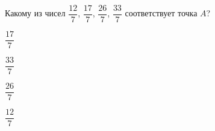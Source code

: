 \begin{ex}
	\begin{condition}
		Какому из чисел $\dfrac{12}{7}$, $\dfrac{17}{7}$, $\dfrac{26}{7}$, $\dfrac{33}{7}$ соответствует точка $A$?
		
		\selectanswer
		\begin{enumcols}[columns=4]
			\item $\dfrac{17}{7}$
			\item $\dfrac{33}{7}$
			\item $\dfrac{26}{7}$
			\item $\dfrac{12}{7}$
		\end{enumcols}
	\end{condition}
\end{ex}